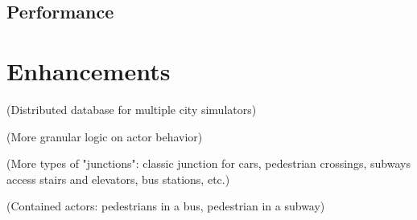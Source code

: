 \documentclass[conference]{IEEEtran}
\begin{document}
\subsection{Performance}

\section{Enhancements}
(Distributed database for multiple city simulators)

(More granular logic on actor behavior)

(More types of "junctions": classic junction for cars, pedestrian crossings, subways access stairs and elevators, bus stations, etc.)

(Contained actors: pedestrians in a bus, pedestrian in a subway)


\vspace{12pt}
\end{document}
